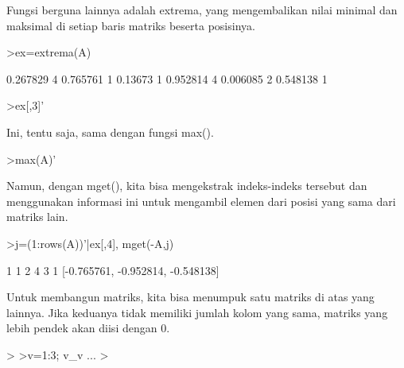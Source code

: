 \documentclass[a4paper,10pt]{article}
\begin{document}
\begin{eulernotebook}
\begin{eulercomment}
\begin{eulercomment}
\begin{eulercomment}
\begin{eulercomment}
\begin{eulercomment}
\begin{eulercomment}
\begin{eulercomment}
\begin{eulercomment}
\begin{eulercomment}
\begin{eulercomment}
\begin{eulercomment}
\begin{eulercomment}
\begin{eulercomment}
\begin{eulercomment}
\begin{eulercomment}
\begin{eulercomment}
\begin{eulercomment}
Fungsi berguna lainnya adalah extrema, yang mengembalikan nilai
minimal dan maksimal di setiap baris matriks beserta posisinya.
\end{eulercomment}
\begin{eulerprompt}
>ex=extrema(A)
\end{eulerprompt}
\begin{euleroutput}
       0.267829             4      0.765761             1 
        0.13673             1      0.952814             4 
       0.006085             2      0.548138             1 
\end{euleroutput}
\begin{eulerprompt}
>ex[,3]'
\end{eulerprompt}
\begin{euleroutput}
  [0.765761,  0.952814,  0.548138]
\end{euleroutput}
\begin{eulercomment}
Ini, tentu saja, sama dengan fungsi max().
\end{eulercomment}
\begin{eulerprompt}
>max(A)'
\end{eulerprompt}
\begin{euleroutput}
  [0.765761,  0.952814,  0.548138]
\end{euleroutput}
\begin{eulercomment}
Namun, dengan mget(), kita bisa mengekstrak indeks-indeks tersebut dan
menggunakan informasi ini untuk mengambil elemen dari posisi yang sama
dari matriks lain.
\end{eulercomment}
\begin{eulerprompt}
>j=(1:rows(A))'|ex[,4], mget(-A,j)
\end{eulerprompt}
\begin{euleroutput}
              1             1 
              2             4 
              3             1 
  [-0.765761,  -0.952814,  -0.548138]
\end{euleroutput}
\begin{eulercomment}
\begin{eulercomment}
\begin{eulercomment}
Untuk membangun matriks, kita bisa menumpuk satu matriks di atas yang
lainnya. Jika keduanya tidak memiliki jumlah kolom yang sama, matriks
yang lebih pendek akan diisi dengan 0.
\end{eulercomment}
\begin{eulerprompt}
> 
>v=1:3; v_v ...
>  
\end{eulerprompt}

\end{eulercomment}
\end{eulercomment}
\end{eulercomment}
\end{eulercomment}
\end{eulercomment}
\end{eulercomment}
\end{eulercomment}
\end{eulercomment}
\end{eulercomment}
\end{eulercomment}
\end{eulercomment}
\end{eulercomment}
\end{eulercomment}
\end{eulercomment}
\end{eulercomment}
\end{eulercomment}
\end{eulercomment}
\end{eulercomment}
\end{eulernotebook}
\end{document}
